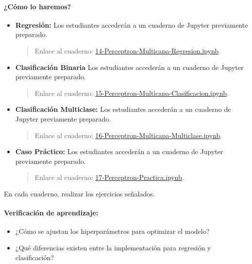 \documentclass[a4,11pt]{aleph-notas}
\begin{document}
\paragraph{¿Cómo lo haremos?}  
\begin{itemize}[leftmargin=*]
    \item \textbf{Regresión:} Los estudiantes accederán a un cuaderno de Jupyter previamente preparado.
    \begin{quote}
        Enlace al cuaderno: \href{https://colab.research.google.com/github/andres-merino/AprendizajeAutomaticoInicial-05-N0105/blob/main/2-Notebooks/14-Perceptron-Multicapa-Regresion.ipynb}{14-Perceptron-Multicapa-Regresion.ipynb}.
    \end{quote}
    \item \textbf{Clasificación Binaria} Los estudiantes accederán a un cuaderno de Jupyter previamente preparado.
    \begin{quote}
        Enlace al cuaderno: \href{https://colab.research.google.com/github/andres-merino/AprendizajeAutomaticoInicial-05-N0105/blob/main/2-Notebooks/15-Perceptron-Multicapa-Clasificacion.ipynb}{15-Perceptron-Multicapa-Clasificacion.ipynb}.
    \end{quote}
    \item \textbf{Clasificación Multiclase:} Los estudiantes accederán a un cuaderno de Jupyter previamente preparado.
    \begin{quote}
        Enlace al cuaderno: \href{https://colab.research.google.com/github/andres-merino/AprendizajeAutomaticoInicial-05-N0105/blob/main/2-Notebooks/16-Perceptron-Multicapa-Multiclase.ipynb}{16-Perceptron-Multicapa-Multiclase.ipynb}.
    \end{quote}
    \item \textbf{Caso Práctico:} Los estudiantes accederán a un cuaderno de Jupyter previamente preparado.
    \begin{quote}
        Enlace al cuaderno: \href{https://colab.research.google.com/github/andres-merino/AprendizajeAutomaticoInicial-05-N0105/blob/main/2-Notebooks/17-Perceptron-Practica.ipynb}{17-Perceptron-Practica.ipynb}.
    \end{quote}
\end{itemize}

\begin{ejer}
En cada cuaderno, realizar los ejercicios señalados.
\end{ejer}

\paragraph{Verificación de aprendizaje:}  
\begin{itemize}[leftmargin=*]
    \item ¿Cómo se ajustan los hiperparámetros para optimizar el modelo?
    \item ¿Qué diferencias existen entre la implementación para regresión y clasificación?
\end{itemize}
\end{document}
